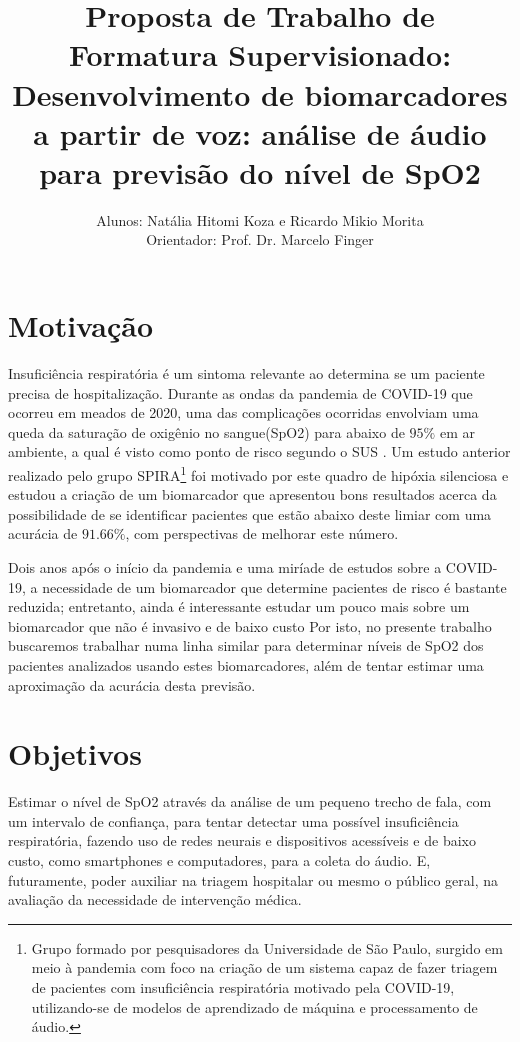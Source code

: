 \documentclass[12pt, a4paper]{article}
\begin{document}
\title{Proposta de Trabalho de Formatura Supervisionado: \textbf{Desenvolvimento de biomarcadores a partir de voz: análise de áudio para previsão do nível de SpO2}}

\author{Alunos: Natália Hitomi Koza e Ricardo Mikio Morita \\ Orientador: Prof. Dr. Marcelo Finger}
\maketitle

\section{Motivação}
Insuficiência respiratória é um sintoma relevante ao determina se um paciente precisa de hospitalização. Durante as ondas da pandemia de COVID-19 que ocorreu em meados de 2020, uma das complicações ocorridas envolviam uma queda da saturação de oxigênio no sangue(SpO2) para abaixo de $95\%$ em ar ambiente, a qual é visto como ponto de risco segundo o SUS \cite{manualcovid}. Um estudo anterior realizado pelo grupo SPIRA\footnote{Grupo formado por pesquisadores da Universidade de São Paulo, surgido em meio à pandemia com foco na criação de um sistema capaz de fazer triagem de pacientes com insuficiência respiratória motivado pela COVID-19, utilizando-se de modelos de aprendizado de máquina e processamento de áudio.} foi motivado por este quadro de hipóxia silenciosa \citep{casanova2021deep} e estudou a criação de um biomarcador que apresentou bons resultados acerca da possibilidade de se identificar pacientes que estão abaixo deste limiar com uma acurácia de $91.66\%$, com perspectivas de melhorar este número.

Dois anos após o início da pandemia e uma miríade de estudos sobre a COVID-19, a necessidade de um biomarcador que determine pacientes de risco é bastante reduzida; entretanto, ainda é interessante estudar um pouco mais sobre um biomarcador que não é invasivo e de baixo custo Por isto, no presente trabalho buscaremos trabalhar numa linha similar para determinar níveis de SpO2 dos pacientes analizados usando estes biomarcadores, além de tentar estimar uma aproximação da acurácia desta previsão.

\section{Objetivos}

Estimar o nível de SpO2 através da análise de um pequeno trecho de fala, com um intervalo de confiança, para tentar detectar uma possível insuficiência respiratória, fazendo uso de redes neurais e dispositivos acessíveis e de baixo custo, como smartphones e computadores, para a coleta do áudio. E, futuramente, poder auxiliar na triagem hospitalar ou mesmo o público geral, na avaliação da necessidade de intervenção médica.
\end{document}

